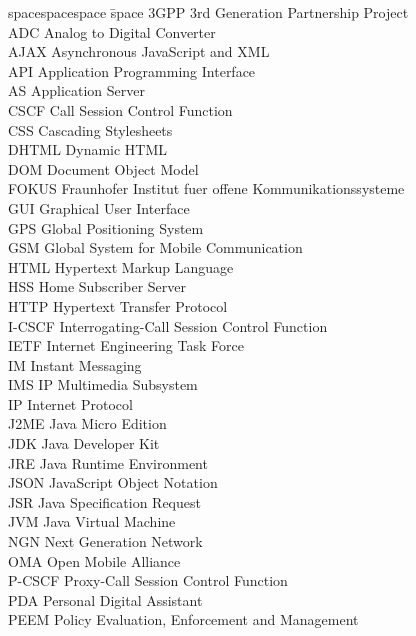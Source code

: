 
\begin{tabbing}
spacespacespace \= space \kill
3GPP	 \> 	3rd Generation Partnership Project	 \\
ADC  \> Analog to Digital Converter\\
AJAX	\>	Asynchronous JavaScript and XML \\
API	 \> 	Application Programming Interface	 \\
AS	\>	Application Server \\
CSCF	 \> 	Call Session Control Function	 \\
CSS	\>	Cascading Stylesheets \\
DHTML	\>	Dynamic HTML \\
DOM	\>	Document Object Model \\
FOKUS	\>	Fraunhofer Institut fuer offene Kommunikationssysteme \\
GUI	\>	Graphical User Interface \\
GPS	\>	Global Positioning System \\
GSM	\>	Global System for Mobile Communication\\
HTML	\>	Hypertext Markup Language \\
HSS	 \> 	Home Subscriber Server	 \\
HTTP	 \> 	Hypertext Transfer Protocol	 \\
I-CSCF	 \> 	Interrogating-Call Session Control Function	 \\
IETF	\>	Internet Engineering Task Force \\
IM	\>	Instant Messaging \\
IMS	 \> 	IP Multimedia Subsystem	 \\
IP	 \> 	Internet Protocol	 \\
J2ME	\>	Java Micro Edition \\
JDK	\>	Java Developer Kit \\
JRE	\>	Java Runtime Environment \\
JSON	\>	JavaScript Object Notation \\
JSR	\>	Java Specification Request \\
JVM	 \> 	Java Virtual Machine	 \\
NGN	 \> 	Next Generation Network	 \\
OMA	 \> 	Open Mobile Alliance	 \\
P-CSCF	 \> 	Proxy-Call Session Control Function	 \\
PDA	\>	Personal Digital Assistant \\
PEEM	 \> 	Policy Evaluation, Enforcement and Management	 \\

\end{tabbing}
